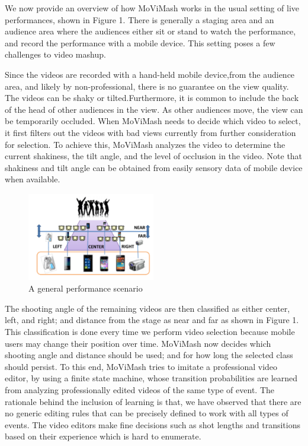 \documentclass{sig-alternate}
\begin{document}
We now provide an overview of how MoViMash works in the usual setting of live performances, shown in Figure 1. There is generally a staging area and an audience area where the audiences either sit or stand to watch the performance, and record the performance with a mobile device. This setting poses a few challenges to video mashup.

Since the videos are recorded with a hand-held mobile device,from the audience area, and likely by non-professional, there is no guarantee on the view quality. The videos can be shaky or tilted.Furthermore, it is common to include the back of the head of other audiences in the view. As other audiences move, the view can be temporarily occluded. When MoViMash needs to decide which video to select, it first filters out the videos with bad views currently from further consideration for selection. To achieve this, MoViMash analyzes the video to determine the current shakiness, the tilt angle, and the level of occlusion in the video. Note that shakiness and tilt angle can be obtained from easily sensory data of mobile device when available.

\begin{figure}[h]
    \centering
    \includegraphics[width=0.5\textwidth]{img1.png}
    \caption{A general performance scenario}
    \label{fig:mesh1}
\end{figure}

The shooting angle of the remaining videos are then classified as either center, left, and right; and distance from the stage as near and far as shown in Figure 1. This classification is done every time we perform video selection because mobile users may change their position over time. MoViMash now decides which shooting angle and distance should be used; and for how long the selected class should persist. To this end, MoViMash tries to imitate a professional video editor, by using a finite state machine, whose transition probabilities are learned from analyzing professionally edited videos of the same type of event. The rationale behind the inclusion of learning is that, we have observed that there are no generic editing rules that can be precisely defined to work with all types of events. The video editors make fine decisions such as shot lengths and transitions based on their experience which is hard to enumerate.
\end{document}

